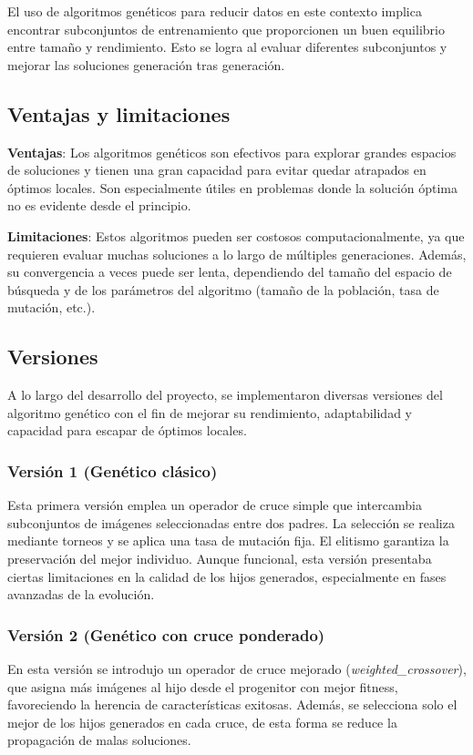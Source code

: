 El uso de algoritmos genéticos para reducir datos en este contexto implica encontrar subconjuntos de entrenamiento que
proporcionen un buen equilibrio entre tamaño y rendimiento.
Esto se logra al evaluar diferentes subconjuntos y mejorar las soluciones generación tras generación.

\subsection{Ventajas y limitaciones}\label{subsec:ventajas-y-limitaciones2}
\textbf{Ventajas}: Los algoritmos genéticos son efectivos para explorar grandes espacios de soluciones y tienen una
gran capacidad para evitar quedar atrapados en óptimos locales.
Son especialmente útiles en problemas donde la solución óptima no es evidente desde el principio.


\textbf{Limitaciones}: Estos algoritmos pueden ser costosos computacionalmente, ya que requieren evaluar muchas
soluciones a lo largo de múltiples generaciones.
Además, su convergencia a veces puede ser lenta, dependiendo del tamaño del espacio de búsqueda y de los
parámetros del algoritmo (tamaño de la población, tasa de mutación, etc.).

\subsection{Versiones}\label{subsec:versiones}
A lo largo del desarrollo del proyecto, se implementaron diversas versiones del algoritmo genético con el fin de
mejorar su rendimiento, adaptabilidad y capacidad para escapar de óptimos locales.

\subsubsection{Versión 1 (Genético clásico)}
Esta primera versión emplea un operador de cruce simple que intercambia subconjuntos de imágenes seleccionadas entre dos padres.
La selección se realiza mediante torneos y se aplica una tasa de mutación fija.
El elitismo garantiza la preservación del mejor individuo.
Aunque funcional, esta versión presentaba ciertas limitaciones en la calidad de los hijos generados,
especialmente en fases avanzadas de la evolución.

\subsubsection{Versión 2 (Genético con cruce ponderado)}
En esta versión se introdujo un operador de cruce mejorado (\textit{weighted\_crossover}), que asigna más imágenes al hijo
desde el progenitor con mejor fitness, favoreciendo la herencia de características exitosas.
Además, se selecciona solo el mejor de los hijos generados en cada cruce, de esta forma se reduce la propagación de malas soluciones.

